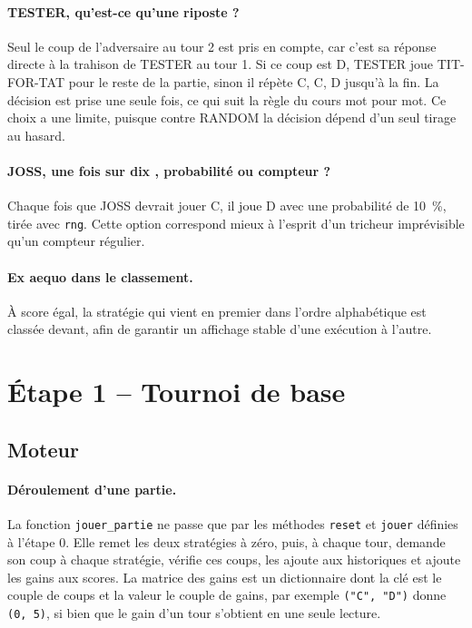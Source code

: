 \documentclass[11pt,a4paper]{article}
\begin{document}
\paragraph{TESTER, qu'est-ce qu'une riposte ?}
Seul le coup de l'adversaire au tour 2 est pris en compte, car c'est sa réponse directe à la trahison de TESTER au tour 1. Si
ce coup est D, TESTER joue TIT-FOR-TAT pour le reste de la partie, sinon il répète C, C, D jusqu'à la fin. La décision est
prise une seule fois, ce qui suit la règle du cours mot pour mot. Ce choix a une limite, puisque contre RANDOM la décision
dépend d'un seul tirage au hasard.

\paragraph{JOSS, \og une fois sur dix \fg{}, probabilité ou compteur ?}
Chaque fois que JOSS devrait jouer C, il joue D avec une probabilité de 10~\%, tirée avec \texttt{rng}. Cette option
correspond mieux à l'esprit d'un tricheur imprévisible qu'un compteur régulier.

\paragraph{Ex aequo dans le classement.}
À score égal, la stratégie qui vient en premier dans l'ordre alphabétique est classée devant, afin de garantir un affichage
stable d'une exécution à l'autre.

\section{Étape 1 -- Tournoi de base}
\subsection{Moteur}
\paragraph{Déroulement d'une partie.} La fonction \texttt{jouer\_partie} ne passe que par les méthodes \texttt{reset} et
\texttt{jouer} définies à l'étape 0. Elle remet les deux stratégies à zéro, puis, à chaque tour, demande son coup à chaque
stratégie, vérifie ces coups, les ajoute aux historiques et ajoute les gains aux scores. La matrice des gains est un
dictionnaire dont la clé est le couple de coups et la valeur le couple de gains, par exemple \texttt{("C", "D")} donne
\texttt{(0, 5)}, si bien que le gain d'un tour s'obtient en une seule lecture.
\end{document}
